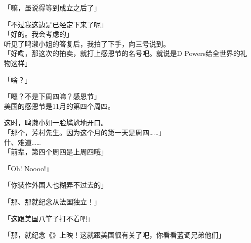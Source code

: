 「嘛，虽说得等到成立之后了」

「不过我这边是已经定下来了呢」\\

「好的。我会考虑的」\\

听见了鸣濑小姐的答复后，我拍了下手，向三号说到。\\

「好嘞，那这次的拍卖，就打上感恩节的名号吧。就说是D Powers给全世界的礼物这样」

「啥？」

「嗯？不是下周四嘛？感恩节」\\

美国的感恩节是11月的第四个周四。

这时，鸣濑小姐一脸尴尬地开口。\\

「那个，芳村先生。因为这个月的第一天是周四……」\\

什、难道……\\

「前辈，第四个周四是上周四哦」

「Oh! Noooo!」

「你装作外国人也糊弄不过去的」

「那、那就纪念从法国独立！」

「这跟美国八竿子打不着吧」

「那，就纪念《》上映！这就跟美国很有关了吧，你看看蓝调兄弟他们」

